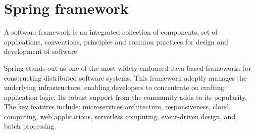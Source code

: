 \section{Spring framework}

\begin{definition}
    A software framework is an integrated collection of components, set of applications, conventions, principles and common practices for design and development of software
\end{definition}
Spring stands out as one of the most widely embraced Java-based frameworks for constructing distributed software systems. 
This framework adeptly manages the underlying infrastructure, enabling developers to concentrate on crafting application logic. 
Its robust support from the community adds to its popularity.
The key features include: microservices architecture, responsiveness, cloud computing, web applications, serverless computing, event-driven design, and batch processing.